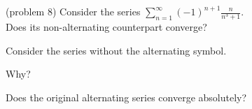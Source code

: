 \documentclass[handout]{ximera}
\begin{document}
\begin{problem}(problem 8)
Consider the series $\displaystyle{\sum_{n=1}^\infty (-1)^{n+1} \frac{n}{n^3 + 1}}$.\\
Does its non-alternating counterpart converge?
\begin{hint} 
Consider the series without the alternating symbol.
\end{hint}
\begin{multipleChoice}
\end{multipleChoice}

Why?
\begin{multipleChoice}
\end{multipleChoice}



Does the original alternating series converge absolutely?
\begin{multipleChoice}
\end{multipleChoice}

\end{problem}
\end{document}

